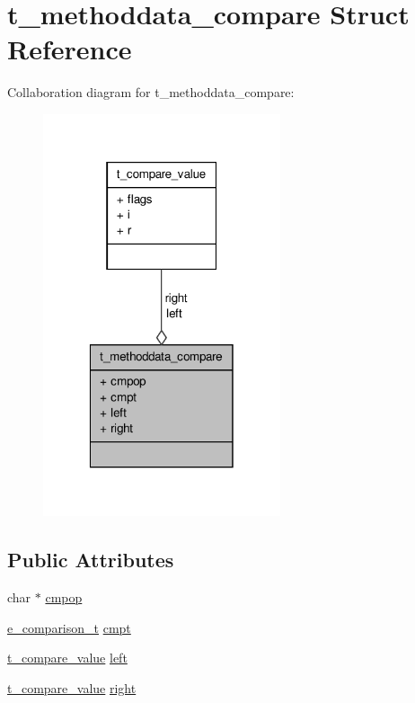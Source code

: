 \hypertarget{structt__methoddata__compare}{\section{t\-\_\-methoddata\-\_\-compare \-Struct \-Reference}
\label{structt__methoddata__compare}
}


\-Collaboration diagram for t\-\_\-methoddata\-\_\-compare\-:
\nopagebreak
\begin{figure}[H]
\begin{center}
\leavevmode
\includegraphics[width=198pt]{structt__methoddata__compare__coll__graph}
\end{center}
\end{figure}
\subsection*{\-Public \-Attributes}
\begin{DoxyCompactItemize}
\item 
char $\ast$ \hyperlink{structt__methoddata__compare_a66fca42300c33bb7585d5b94d28b6254}{cmpop}
\item 
\hyperlink{sm__compare_8c_a4c494127cd83d1f0dae8853a278569b5}{e\-\_\-comparison\-\_\-t} \hyperlink{structt__methoddata__compare_a372ef3b61c063e2ee4cf032cc56879d7}{cmpt}
\item 
\hyperlink{structt__compare__value}{t\-\_\-compare\-\_\-value} \hyperlink{structt__methoddata__compare_aa715855f77b5f7bbf854aff0fc29102d}{left}
\item 
\hyperlink{structt__compare__value}{t\-\_\-compare\-\_\-value} \hyperlink{structt__methoddata__compare_ac382cfe023969100b9b77c3a6120e44b}{right}
\end{DoxyCompactItemize}


